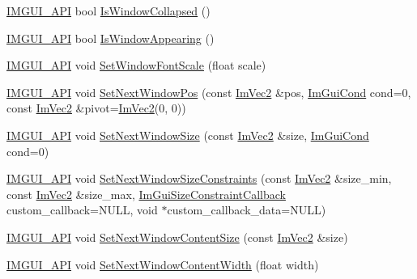 \begin{DoxyCompactItemize}
\item 
\mbox{\hyperlink{imgui_8h_a43829975e84e45d1149597467a14bbf5}{I\+M\+G\+U\+I\+\_\+\+A\+PI}} bool \mbox{\hyperlink{namespace_im_gui_a2a6492aea9013c0078fc530a66e11768}{Is\+Window\+Collapsed}} ()
\item 
\mbox{\hyperlink{imgui_8h_a43829975e84e45d1149597467a14bbf5}{I\+M\+G\+U\+I\+\_\+\+A\+PI}} bool \mbox{\hyperlink{namespace_im_gui_a99fd14154aae264087d471132e56a42e}{Is\+Window\+Appearing}} ()
\item 
\mbox{\hyperlink{imgui_8h_a43829975e84e45d1149597467a14bbf5}{I\+M\+G\+U\+I\+\_\+\+A\+PI}} void \mbox{\hyperlink{namespace_im_gui_a11f2f343dbc9b00ccd9e99ebd59cfe8b}{Set\+Window\+Font\+Scale}} (float scale)
\item 
\mbox{\hyperlink{imgui_8h_a43829975e84e45d1149597467a14bbf5}{I\+M\+G\+U\+I\+\_\+\+A\+PI}} void \mbox{\hyperlink{namespace_im_gui_afbccd31113430670b5ab2bf0d6f509bf}{Set\+Next\+Window\+Pos}} (const \mbox{\hyperlink{struct_im_vec2}{Im\+Vec2}} \&pos, \mbox{\hyperlink{imgui_8h_aef890d6ac872e12c5804d0b3e4f7f103}{Im\+Gui\+Cond}} cond=0, const \mbox{\hyperlink{struct_im_vec2}{Im\+Vec2}} \&pivot=\mbox{\hyperlink{struct_im_vec2}{Im\+Vec2}}(0, 0))
\item 
\mbox{\hyperlink{imgui_8h_a43829975e84e45d1149597467a14bbf5}{I\+M\+G\+U\+I\+\_\+\+A\+PI}} void \mbox{\hyperlink{namespace_im_gui_ab33717bb71ef5e393ae18656fc6b229d}{Set\+Next\+Window\+Size}} (const \mbox{\hyperlink{struct_im_vec2}{Im\+Vec2}} \&size, \mbox{\hyperlink{imgui_8h_aef890d6ac872e12c5804d0b3e4f7f103}{Im\+Gui\+Cond}} cond=0)
\item 
\mbox{\hyperlink{imgui_8h_a43829975e84e45d1149597467a14bbf5}{I\+M\+G\+U\+I\+\_\+\+A\+PI}} void \mbox{\hyperlink{namespace_im_gui_a06f40aaf9cf2539c8dba43156a131e45}{Set\+Next\+Window\+Size\+Constraints}} (const \mbox{\hyperlink{struct_im_vec2}{Im\+Vec2}} \&size\+\_\+min, const \mbox{\hyperlink{struct_im_vec2}{Im\+Vec2}} \&size\+\_\+max, \mbox{\hyperlink{imgui_8h_abc6351d68ee31882cbb95d2b3d835cae}{Im\+Gui\+Size\+Constraint\+Callback}} custom\+\_\+callback=N\+U\+LL, void $\ast$custom\+\_\+callback\+\_\+data=N\+U\+LL)
\item 
\mbox{\hyperlink{imgui_8h_a43829975e84e45d1149597467a14bbf5}{I\+M\+G\+U\+I\+\_\+\+A\+PI}} void \mbox{\hyperlink{namespace_im_gui_aae55a58c38d8e84b10eb1e8b1531372d}{Set\+Next\+Window\+Content\+Size}} (const \mbox{\hyperlink{struct_im_vec2}{Im\+Vec2}} \&size)
\item 
\mbox{\hyperlink{imgui_8h_a43829975e84e45d1149597467a14bbf5}{I\+M\+G\+U\+I\+\_\+\+A\+PI}} void \mbox{\hyperlink{namespace_im_gui_a94731b8482ed9298a9ac454061e79e8a}{Set\+Next\+Window\+Content\+Width}} (float width)

\end{DoxyCompactItemize}
